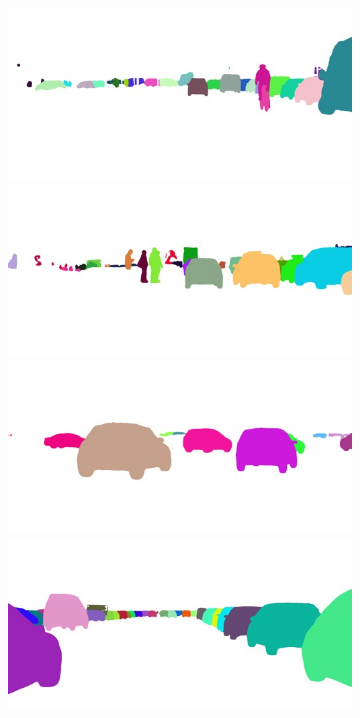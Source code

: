 {\begin{figure}[t]
{{\begin{subfigure}[t]{0.24\linewidth}
\begin{center}
		\includegraphics[width=\linewidth,trim={0px 60px 0 0px},clip]{qualitative/berlin_000010_000019_instance_segmentation.jpg}
		\includegraphics[width=\linewidth,trim={0px 60px 0 0px},clip]{qualitative/berlin_000036_000019_instance_segmentation.jpg}
		\includegraphics[width=\linewidth,trim={0px 60px 0 0px},clip]{qualitative/berlin_000046_000019_instance_segmentation.jpg}
		\includegraphics[width=\linewidth,trim={0px 60px 0 0px},clip]{qualitative/berlin_000049_000019_instance_segmentation.jpg}

\end{center}
\end{subfigure}}}
\end{figure}}

